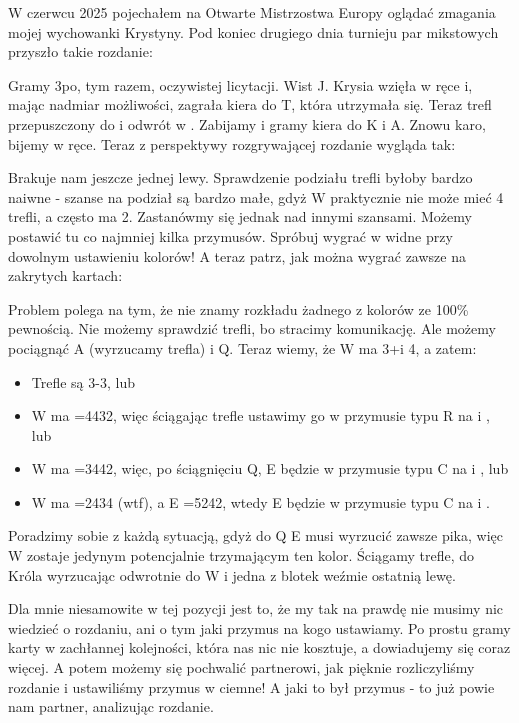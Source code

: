 \documentclass[12pt, a4paper]{article}
\newcounter{board}
\newcommand\nextboard{\stepcounter{board}\theboard}
\begin{document}
W czerwcu 2025 pojechałem na Otwarte Mistrzostwa Europy oglądać zmagania mojej wychowanki Krystyny. Pod koniec drugiego dnia turnieju par mikstowych przyszło takie rozdanie:

\handdiagramv[\nextboard]{\vhand{AK52}{QT42}{K3}{763}}
				{}
				{}
				{}{}

Gramy 3\nt po, tym razem, oczywistej licytacji. Wist \xspades J. Krysia wzięła w ręce i, mając nadmiar możliwości, zagrała kiera do \xhearts T, która utrzymała się. 
Teraz trefl przepuszczony do  i odwrót w . Zabijamy i gramy kiera do \xhearts K i A. Znowu karo, bijemy w ręce. Teraz z perspektywy rozgrywającej rozdanie wygląda tak:

				{}
				{}
				{}{}
				
Brakuje nam jeszcze jednej lewy. Sprawdzenie podziału trefli byłoby bardzo naiwne - szanse na podział są bardzo małe, gdyż W praktycznie nie może mieć 4 trefli, a często ma 2.
Zastanówmy się jednak nad innymi szansami. Możemy postawić tu co najmniej kilka przymusów. Spróbuj wygrać w widne przy dowolnym ustawieniu kolorów! A teraz patrz, jak można wygrać zawsze na zakrytych kartach:

Problem polega na tym, że nie znamy rozkładu żadnego z kolorów ze 100\% pewnością. Nie możemy sprawdzić trefli, bo stracimy komunikację. Ale możemy pociągnąć \xdiams A (wyrzucamy trefla) i \xhearts Q. 
Teraz wiemy, że W ma 3+\diams i 4\hearts, a zatem:
\begin{itemize}
	\item Trefle są 3-3, lub
	\item W ma =4432, więc ściągając trefle ustawimy go w przymusie typu R na \spades i \hearts, lub
	\item W ma =3442, więc, po ściągnięciu \xhearts Q, E będzie w przymusie typu C na \spades i \clubs, lub
	\item W ma =2434 (wtf), a E =5242, wtedy E będzie w przymusie typu C na \spades i \diams.
\end{itemize}

Poradzimy sobie z każdą sytuacją, gdyż do \xhearts Q E musi wyrzucić zawsze pika, więc W zostaje jedynym potencjalnie trzymającym ten kolor. Ściągamy trefle, do Króla wyrzucając odwrotnie do W i jedna z blotek weźmie ostatnią lewę.

Dla mnie niesamowite w tej pozycji jest to, że my tak na prawdę nie musimy nic wiedzieć o rozdaniu, ani o tym jaki przymus na kogo ustawiamy. Po prostu gramy karty w zachłannej kolejności,
która nas nic nie kosztuje, a dowiadujemy się coraz więcej. A potem możemy się pochwalić partnerowi, jak pięknie rozliczyliśmy rozdanie i ustawiliśmy przymus w ciemne! A jaki to był przymus - to już powie nam partner, analizując rozdanie. 
\end{document}
